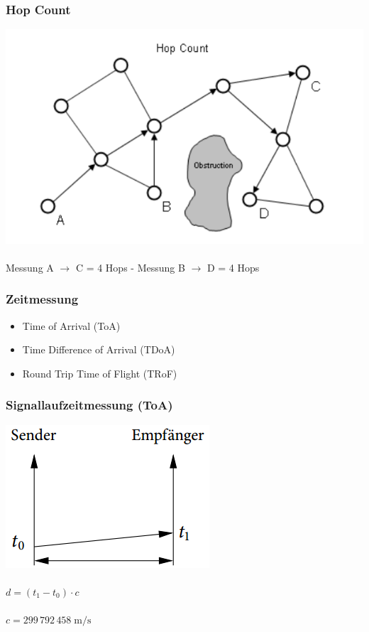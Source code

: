 \begin{frame}
  \frametitle{Hop Count}

  \begin{center}
  \includegraphics[scale=0.5]{img/hop_count1}
  \\~\\
  Messung A $\to$ C = 4 Hops - Messung B $\to$ D = 4 Hops
  \end{center}
\end{frame}

\begin{frame}
\frametitle{Zeitmessung}

\begin{itemize}
  \item Time of Arrival (ToA)
  \item Time Difference of Arrival (TDoA)
  \item Round Trip Time of Flight (TRoF)
\end{itemize}
\end{frame}

\begin{frame}
  \frametitle{Signallaufzeitmessung (ToA)}

  \begin{center}
    \includegraphics[scale=0.35]{img/time1}\\~\\

    $d = (t_{1} - t_{0}) \cdot c$\\~\\
    $c=299\,792\,458\;\mathrm{m/s}$
  \end{center}
\end{frame}



